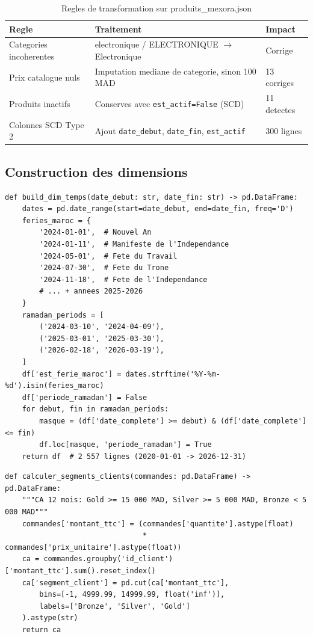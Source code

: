 \documentclass[12pt,a4paper]{article}
\begin{document}
\begin{table}[H]
\centering
\begin{tabular}{p{4cm} p{6cm} p{2.5cm}}
\toprule
\textbf{Regle} & \textbf{Traitement} & \textbf{Impact}\\
\midrule
Categories incoherentes & electronique / ELECTRONIQUE $\to$ Electronique & Corrige\\
Prix catalogue nuls & Imputation mediane de categorie, sinon 100 MAD & 13 corriges\\
Produits inactifs & Conserves avec \texttt{est\_actif=False} (SCD) & 11 detectes\\
Colonnes SCD Type 2 & Ajout \texttt{date\_debut}, \texttt{date\_fin}, \texttt{est\_actif} & 300 lignes\\
\bottomrule
\end{tabular}
\caption{Regles de transformation sur produits\_mexora.json}
\end{table}

\subsection{Construction des dimensions}

\begin{lstlisting}[style=python, caption=build\_dim\_temps -- feries marocains et Ramadan]
def build_dim_temps(date_debut: str, date_fin: str) -> pd.DataFrame:
    dates = pd.date_range(start=date_debut, end=date_fin, freq='D')
    feries_maroc = {
        '2024-01-01',  # Nouvel An
        '2024-01-11',  # Manifeste de l'Independance
        '2024-05-01',  # Fete du Travail
        '2024-07-30',  # Fete du Trone
        '2024-11-18',  # Fete de l'Independance
        # ... + annees 2025-2026
    }
    ramadan_periods = [
        ('2024-03-10', '2024-04-09'),
        ('2025-03-01', '2025-03-30'),
        ('2026-02-18', '2026-03-19'),
    ]
    df['est_ferie_maroc'] = dates.strftime('%Y-%m-%d').isin(feries_maroc)
    df['periode_ramadan'] = False
    for debut, fin in ramadan_periods:
        masque = (df['date_complete'] >= debut) & (df['date_complete'] <= fin)
        df.loc[masque, 'periode_ramadan'] = True
    return df  # 2 557 lignes (2020-01-01 -> 2026-12-31)
\end{lstlisting}

\begin{lstlisting}[style=python, caption=calculer\_segments\_clients -- Gold/Silver/Bronze]
def calculer_segments_clients(commandes: pd.DataFrame) -> pd.DataFrame:
    """CA 12 mois: Gold >= 15 000 MAD, Silver >= 5 000 MAD, Bronze < 5 000 MAD"""
    commandes['montant_ttc'] = (commandes['quantite'].astype(float)
                                * commandes['prix_unitaire'].astype(float))
    ca = commandes.groupby('id_client')['montant_ttc'].sum().reset_index()
    ca['segment_client'] = pd.cut(ca['montant_ttc'],
        bins=[-1, 4999.99, 14999.99, float('inf')],
        labels=['Bronze', 'Silver', 'Gold']
    ).astype(str)
    return ca
\end{lstlisting}
\end{document}
